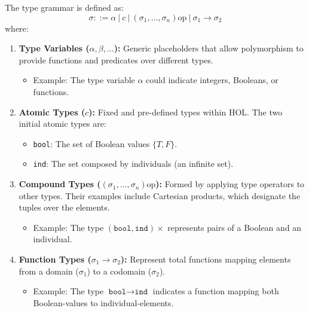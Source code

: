 The type grammar is defined as:
\[
\sigma ::= \alpha \ | \ c \ | \ (\sigma_1, \ldots, \sigma_n)\text{op} \ | \ \sigma_1 \to \sigma_2
\]
where:
\begin{enumerate}
    \item \textbf{Type Variables ($\alpha, \beta, \ldots$):} Generic placeholders that allow polymorphism to provide functions and predicates over different types.
    \begin{itemize}
        \item Example: The type variable $\alpha$ could indicate integers, Booleans, or functions.
    \end{itemize}

    \item \textbf{Atomic Types ($c$):} Fixed and pre-defined types within HOL. The two initial atomic types are:
    \begin{itemize}
        \item \texttt{bool}: The set of Boolean values $\{T, F\}$.
        \item \texttt{ind}: The set composed by individuals (an infinite set).

    \end{itemize}

    \item \textbf{Compound Types ($(\sigma_1, \ldots, \sigma_n)\text{op}$):} Formed by applying type operators to other types. Their examples include Cartesian products, which designate the tuples over the elements.
    \begin{itemize}
        \item Example: The type $(\texttt{bool}, \texttt{ind}) \times$ represents pairs of a Boolean and an individual.
    \end{itemize}

    \item \textbf{Function Types ($\sigma_1 \to \sigma_2$):} Represent total functions mapping elements from a domain ($\sigma_1$) to a codomain ($\sigma_2$).
    \begin{itemize}
        \item Example: The type $\texttt{bool} \to \texttt{ind}$ indicates a function mapping both Boolean-values to individual-elements.
    \end{itemize}
\end{enumerate}

